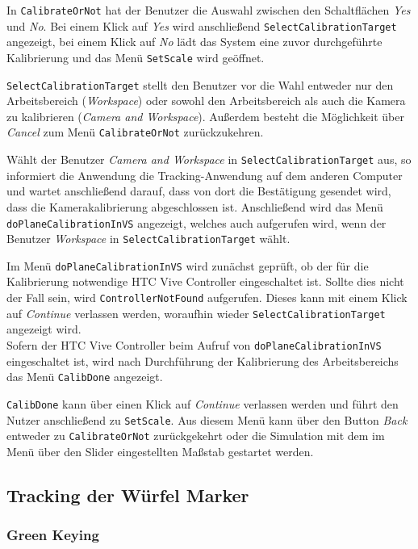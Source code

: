 In \texttt{CalibrateOrNot} hat der Benutzer die Auswahl zwischen den Schaltflächen \textit{Yes} und \textit{No}. Bei einem Klick auf \textit{Yes} wird anschließend \texttt{Select\-Calibration\-Target} angezeigt, bei einem Klick auf \textit{No} lädt das System eine zuvor durchgeführte Kalibrierung und das Menü \texttt{Set\-Scale} wird geöffnet.

\texttt{Select\-Calibration\-Target} stellt den Benutzer vor die Wahl entweder nur den Arbeitsbereich (\textit{Work\-space}) oder sowohl den Arbeitsbereich als auch die Kamera zu kalibrieren (\textit{Camera and Workspace}). Außerdem besteht die Möglichkeit über \textit{Cancel} zum Menü \texttt{Calibrate\-Or\-Not} zurückzukehren.

Wählt der Benutzer \textit{Camera and Workspace} in \texttt{Select\-Calibration\-Target} aus, so informiert die Anwendung die Tracking-Anwendung auf dem anderen Computer und wartet anschließend darauf, dass von dort die Bestätigung gesendet wird, dass die Kamerakalibrierung abgeschlossen ist. Anschließend wird das Menü \texttt{doPlane\-Calibration\-InVS} angezeigt, welches auch aufgerufen wird, wenn der Benutzer \textit{Work\-space} in \texttt{Select\-Calibration\-Target} wählt.

Im Menü \texttt{doPlane\-Calibration\-InVS} wird zunächst geprüft, ob der für die Kalibrierung notwendige HTC Vive Controller eingeschaltet ist. Sollte dies nicht der Fall sein, wird \texttt{Controller\-Not\-Found} aufgerufen. Dieses kann mit einem Klick auf \textit{Continue} verlassen werden, woraufhin wieder \texttt{Select\-Calibration\-Target} angezeigt wird.\\
Sofern der HTC Vive Controller beim Aufruf von \texttt{doPlane\-Calibration\-InVS} eingeschaltet ist, wird nach Durchführung der Kalibrierung des Arbeitsbereichs das Menü \texttt{CalibDone} angezeigt.

\texttt{Calib\-Done} kann über einen Klick auf \textit{Continue} verlassen werden und führt den Nutzer anschließend zu \texttt{SetScale}. Aus diesem Menü kann über den Button \textit{Back} entweder zu \texttt{CalibrateOrNot} zurückgekehrt oder die Simulation mit dem im Menü über den Slider eingestellten Maßstab gestartet werden.

\subsection{Tracking der Würfel Marker}
\subsubsection{Green Keying}
